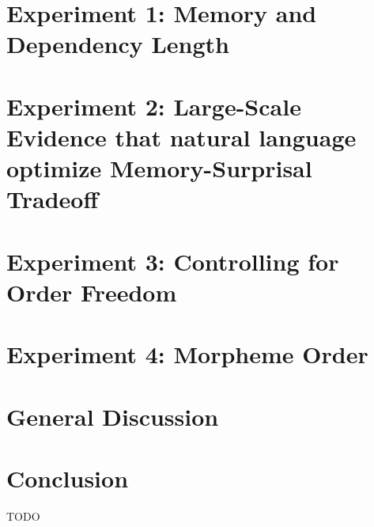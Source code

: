 \documentclass[11pt,letterpaper]{article}
\begin{document}


\section{Experiment 1: Memory and Dependency Length}



%


\section{Experiment 2: Large-Scale Evidence that natural language optimize Memory-Surprisal Tradeoff}



\section{Experiment 3: Controlling for Order Freedom}



\section{Experiment 4: Morpheme Order}




\section{General Discussion}




\section{Conclusion}

TODO




\end{document}
